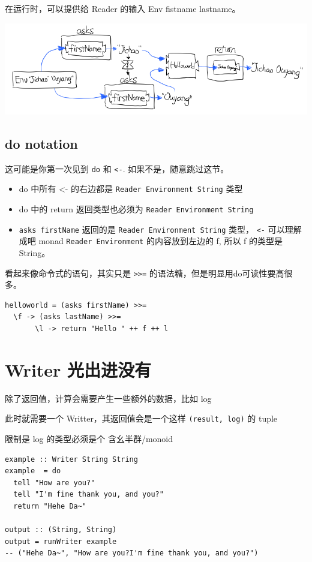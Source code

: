 \documentclass[letterspacing]{tufte-book}
\begin{document}
在运行时，可以提供给 Reader 的输入 Env fistname lastname。
\begin{center}
\includegraphics[width=.9\linewidth]{images/p2-reader-monad-run.png}
\end{center}

\section{do notation}
\label{sec:orgcd119be}
这可能是你第一次见到 \texttt{do} 和 \texttt{<-}. 如果不是，随意跳过这节。

\begin{itemize}
\item do 中所有 <- 的右边都是 \texttt{Reader Environment String} 类型
\item do 中的 return 返回类型也必须为  \texttt{Reader Environment String}
\item \texttt{asks firstName} 返回的是 \texttt{Reader Environment String} 类型， \texttt{<-} 可以理解成吧 monad \texttt{Reader Environment} 的内容放到左边的 f, 所以 f 的类型是 String。
\end{itemize}

看起来像命令式的语句，其实只是 \texttt{>>=} 的语法糖，但是明显用do可读性要高很多。
\lstset{language=haskell,label= ,caption= ,captionpos=b,numbers=none}
\begin{lstlisting}
helloworld = (asks firstName) >>=
  \f -> (asks lastName) >>=
       \l -> return "Hello " ++ f ++ l
\end{lstlisting}


\chapter{Writer 光出进没有}
\label{sec:org97934f2}

除了返回值，计算会需要产生一些额外的数据，比如 log

此时就需要一个 Writter，其返回值会是一个这样 \texttt{(result, log)} 的 tuple

限制是 log 的类型必须是个 含幺半群/monoid

\lstset{language=haskell,label= ,caption= ,captionpos=b,numbers=none}
\begin{lstlisting}
example :: Writer String String
example  = do
  tell "How are you?"
  tell "I'm fine thank you, and you?"
  return "Hehe Da~"

output :: (String, String)
output = runWriter example
-- ("Hehe Da~", "How are you?I'm fine thank you, and you?")
\end{lstlisting}
\end{document}
